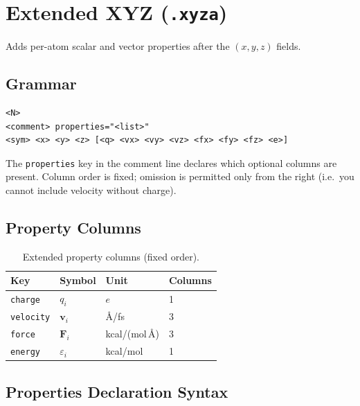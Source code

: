 \documentclass[12pt, a4paper, oneside]{article}
\begin{document}
\section{Extended XYZ (\texttt{.xyza})}
\label{sec:xyza}

Adds per-atom scalar and vector properties after the $(x, y, z)$
fields.

\subsection{Grammar}

\begin{lstlisting}[language={},frame=single]
<N>
<comment> properties="<list>"
<sym> <x> <y> <z> [<q> <vx> <vy> <vz> <fx> <fy> <fz> <e>]
\end{lstlisting}

The \texttt{properties} key in the comment line declares which
optional columns are present.  Column order is fixed; omission is
permitted only from the right (i.e.\ you cannot include velocity
without charge).

\subsection{Property Columns}

\begin{table}[htbp]
  \centering
  \caption{Extended property columns (fixed order).}
  \label{tab:xyza_cols}
  \begin{tabular}{llll}
    \toprule
    Key & Symbol & Unit & Columns \\
    \midrule
    \texttt{charge}   & $q_i$          & $e$                   & 1 \\
    \texttt{velocity} & $\mathbf{v}_i$ & \AA/fs                & 3 \\
    \texttt{force}    & $\mathbf{F}_i$ & kcal/(mol\,\AA)       & 3 \\
    \texttt{energy}   & $\varepsilon_i$& kcal/mol              & 1 \\
    \bottomrule
  \end{tabular}
\end{table}

\subsection{Properties Declaration Syntax}
\end{document}
